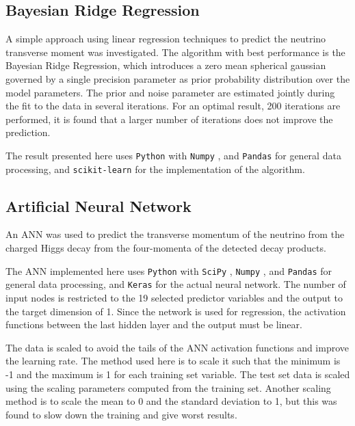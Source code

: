 \documentclass{scrartcl}
\begin{document}
\subsection{Bayesian Ridge Regression}

A simple approach using linear regression techniques to predict the neutrino transverse moment was investigated. The algorithm with best performance is the Bayesian Ridge Regression, which introduces a zero mean spherical gaussian governed by a single precision parameter as prior probability distribution over the model parameters. The prior and noise parameter are estimated jointly during the fit to the data in several iterations. For an optimal result, 200 iterations are performed, it is found that a larger number of iterations does not improve the prediction.

The result presented here uses \texttt{Python} with \texttt{Numpy} \cite{numpy}, and \texttt{Pandas} \cite{pandas} for general data processing, and \texttt{scikit-learn} \cite{scikit-learn} for the implementation of the algorithm.


\subsection{Artificial Neural Network}

An \gls{ANN} was used to predict the transverse momentum of the neutrino from the charged Higgs decay from the four-momenta of the detected decay products. 

The \gls{ANN} implemented here uses \texttt{Python} with \texttt{SciPy} \cite{scipy}, \texttt{Numpy} \cite{numpy}, and \texttt{Pandas} \cite{pandas} for general data processing, and \texttt{Keras} \cite{keras} for the actual neural network. The number of input nodes is restricted to the 19 selected predictor variables and the output to the target dimension of 1. Since the network is used for regression, the activation functions between the last hidden layer and the output must be linear.

The data is scaled to avoid the tails of the \gls{ANN} activation functions and improve the learning rate. The method used here is to scale it such that the minimum is -1 and the maximum is 1 for each training set variable. The test set data is scaled using the scaling parameters computed from the training set. Another scaling method is to scale the mean to 0 and the standard deviation to 1, but this was found to slow down the training and give worst results.
\end{document}
